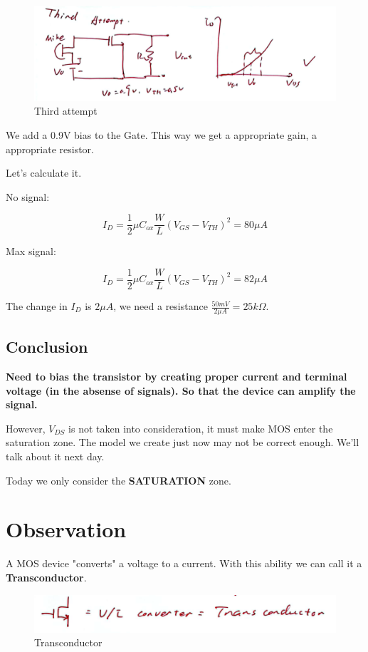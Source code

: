 \documentclass[fontset=windows]{article}
\begin{document}
\begin{figure}[htbp]
    \centering
    \includegraphics[scale=0.6]{6.jpg}
    \captionsetup{labelformat=empty}
    \caption{Third attempt}
    \label{6}
\end{figure}

We add a 0.9V bias to the Gate. This way we get a appropriate gain, a appropriate resistor. 

Let's calculate it. 

No signal: 

$$I_D=\frac{1}{2} \mu C_{ox}\frac{W}{L}(V_{GS}-V_{TH})^2=80\mu A$$

Max signal: 

$$I_D=\frac{1}{2} \mu C_{ox}\frac{W}{L}(V_{GS}-V_{TH})^2=82\mu A$$

The change in $I_D$ is $2\mu A$, we need a resistance $\frac{50mV}{2\mu A}=25k\Omega$. 

\subsection*{Conclusion}
\textbf{Need to bias the transistor by creating proper current and terminal voltage (in the absense of signals). 
So that the device can amplify the signal.}

However, $V_{DS}$ is not taken into consideration, it must make MOS enter the saturation zone. The model we create just now may not be correct enough. 
We'll talk about it next day. 

Today we only consider the \textbf{SATURATION} zone. 

\section*{Observation}

A MOS device "converts" a voltage to a current. With this ability we can call it a \textbf{Transconductor}. 

\begin{figure}[htbp]
    \centering
    \includegraphics[scale=0.6]{7.jpg}
    \captionsetup{labelformat=empty}
    \caption{Transconductor}
    \label{7}
\end{figure}
\end{document}
